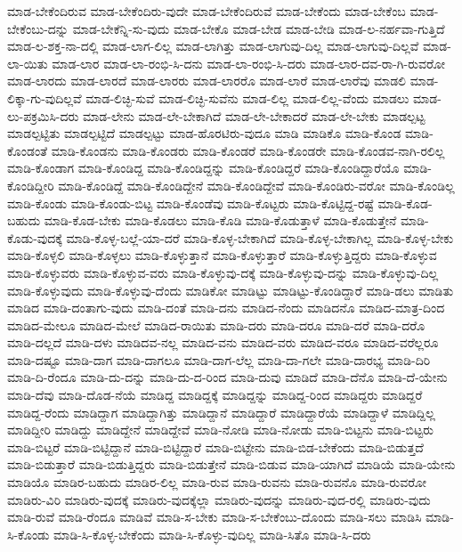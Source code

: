 {ಮಾಡ-ಬೇಕೆಂದಿರುವ
ಮಾಡ-ಬೇಕೆಂದಿರು-ವುದೇ
ಮಾಡ-ಬೇಕೆಂದಿರುವೆ
ಮಾಡ-ಬೇಕೆಂದು
ಮಾಡ-ಬೇಕೆಂಬ
ಮಾಡ-ಬೇಕೆಂಬು-ದನ್ನು
ಮಾಡ-ಬೇಕೆನ್ನಿ-ಸು-ವುದು
ಮಾಡ-ಬೇಕೊ
ಮಾಡ-ಬೇಡ
ಮಾಡ-ಬೇಡಿ
ಮಾಡ-ಲ-ನರ್ಹವಾ-ಗುತ್ತಿದೆ
ಮಾಡ-ಲ-ಶಕ್ತ-ನಾ-ದಲ್ಲಿ
ಮಾಡ-ಲಾಗ-ಲಿಲ್ಲ
ಮಾಡ-ಲಾಗಿತ್ತು
ಮಾಡ-ಲಾಗುವು-ದಿಲ್ಲ
ಮಾಡ-ಲಾಗುವು-ದಿಲ್ಲವೆ
ಮಾಡ-ಲಾ-ಯಿತು
ಮಾಡ-ಲಾರ
ಮಾಡ-ಲಾ-ರಂಭಿ-ಸಿ-ದನು
ಮಾಡ-ಲಾ-ರಂಭಿ-ಸಿ-ದರು
ಮಾಡ-ಲಾರ-ದವ-ರಾ-ಗಿ-ರುವರೋ
ಮಾಡ-ಲಾರದು
ಮಾಡ-ಲಾರದೆ
ಮಾಡ-ಲಾರರು
ಮಾಡ-ಲಾರರೊ
ಮಾಡ-ಲಾರೆ
ಮಾಡ-ಲಾರೆವು
ಮಾಡಲಿ
ಮಾಡ-ಲಿಕ್ಕಾ-ಗು-ವುದಿಲ್ಲವೆ
ಮಾಡ-ಲಿಚ್ಛಿ-ಸುವೆ
ಮಾಡ-ಲಿಚ್ಛಿ-ಸುವೆನು
ಮಾಡ-ಲಿಲ್ಲ
ಮಾಡ-ಲಿಲ್ಲ-ವೆಂದು
ಮಾಡಲು
ಮಾಡ-ಲು-ಪಕ್ರಮಿಸಿ-ದರು
ಮಾಡ-ಲೇನು
ಮಾಡ-ಲೇ-ಬೇಕಾಗಿದೆ
ಮಾಡ-ಲೇ-ಬೇಕಾದರೆ
ಮಾಡ-ಲೇ-ಬೇಕು
ಮಾಡಲ್ಪಟ್ಟ
ಮಾಡಲ್ಪಟ್ಟಿತು
ಮಾಡಲ್ಪಟ್ಟಿದೆ
ಮಾಡಲ್ಪಟ್ಟು
ಮಾಡ-ಹೊರಟಿರು-ವುದೂ
ಮಾಡಿ
ಮಾಡಿಕೊ
ಮಾಡಿ-ಕೊಂಡ
ಮಾಡಿ-ಕೊಂಡಂತೆ
ಮಾಡಿ-ಕೊಂಡನು
ಮಾಡಿ-ಕೊಂಡರು
ಮಾಡಿ-ಕೊಂಡರೆ
ಮಾಡಿ-ಕೊಂಡರೇ
ಮಾಡಿ-ಕೊಂಡವ-ನಾಗಿ-ರಲಿಲ್ಲ
ಮಾಡಿ-ಕೊಂಡಾಗ
ಮಾಡಿ-ಕೊಂಡಿದ್ದ
ಮಾಡಿ-ಕೊಂಡಿದ್ದನ್ನು
ಮಾಡಿ-ಕೊಂಡಿದ್ದರೆ
ಮಾಡಿ-ಕೊಂಡಿದ್ದಾರೆಯೊ
ಮಾಡಿ-ಕೊಂಡಿದ್ದೀರಿ
ಮಾಡಿ-ಕೊಂಡಿದ್ದೆ
ಮಾಡಿ-ಕೊಂಡಿದ್ದೇನೆ
ಮಾಡಿ-ಕೊಂಡಿದ್ದೇವೆ
ಮಾಡಿ-ಕೊಂಡಿರು-ವರೋ
ಮಾಡಿ-ಕೊಂಡಿಲ್ಲ
ಮಾಡಿ-ಕೊಂಡು
ಮಾಡಿ-ಕೊಂಡು-ಬಿಟ್ಟ
ಮಾಡಿ-ಕೊಂಡೆವು
ಮಾಡಿ-ಕೊಟ್ಟರು
ಮಾಡಿ-ಕೊಟ್ಟಿದ್ದ-ರಷ್ಟೆ
ಮಾಡಿ-ಕೊಡ-ಬಹುದು
ಮಾಡಿ-ಕೊಡ-ಬೇಕು
ಮಾಡಿ-ಕೊಡಲು
ಮಾಡಿ-ಕೊಡಿ
ಮಾಡಿ-ಕೊಡುತ್ತಾಳೆ
ಮಾಡಿ-ಕೊಡುತ್ತೇನೆ
ಮಾಡಿ-ಕೊಡು-ವುದಕ್ಕೆ
ಮಾಡಿ-ಕೊಳ್ಳ-ಬಲ್ಲೆ-ಯಾ-ದರೆ
ಮಾಡಿ-ಕೊಳ್ಳ-ಬೇಕಾಗಿದೆ
ಮಾಡಿ-ಕೊಳ್ಳ-ಬೇಕಾಗಿಲ್ಲ
ಮಾಡಿ-ಕೊಳ್ಳ-ಬೇಕು
ಮಾಡಿ-ಕೊಳ್ಳಲಿ
ಮಾಡಿ-ಕೊಳ್ಳಲು
ಮಾಡಿ-ಕೊಳ್ಳುತ್ತಾನೆ
ಮಾಡಿ-ಕೊಳ್ಳುತ್ತಾರೆ
ಮಾಡಿ-ಕೊಳ್ಳುತ್ತಿದ್ದರು
ಮಾಡಿ-ಕೊಳ್ಳುವ
ಮಾಡಿ-ಕೊಳ್ಳುವರು
ಮಾಡಿ-ಕೊಳ್ಳುವ-ವರು
ಮಾಡಿ-ಕೊಳ್ಳುವು-ದಕ್ಕೆ
ಮಾಡಿ-ಕೊಳ್ಳುವು-ದನ್ನು
ಮಾಡಿ-ಕೊಳ್ಳುವು-ದಿಲ್ಲ
ಮಾಡಿ-ಕೊಳ್ಳುವುದು
ಮಾಡಿ-ಕೊಳ್ಳುವು-ದೆಂದು
ಮಾಡಿಕೋ
ಮಾಡಿಟ್ಟು
ಮಾಡಿಟ್ಟು-ಕೊಂಡಿದ್ದಾರೆ
ಮಾಡಿ-ಡಲು
ಮಾಡಿತು
ಮಾಡಿದ
ಮಾಡಿ-ದಂತಾಗು-ವುದು
ಮಾಡಿ-ದಂತೆ
ಮಾಡಿ-ದನು
ಮಾಡಿದ-ನೆಂದು
ಮಾಡಿದನೊ
ಮಾಡಿದ-ಮಾತ್ರ-ದಿಂದ
ಮಾಡಿದ-ಮೇಲೂ
ಮಾಡಿದ-ಮೇಲೆ
ಮಾಡಿದ-ರಾಯಿತು
ಮಾಡಿ-ದರು
ಮಾಡಿ-ದರೂ
ಮಾಡಿ-ದರೆ
ಮಾಡಿ-ದರೊ
ಮಾಡಿ-ದಲ್ಲದೆ
ಮಾಡಿ-ದಳು
ಮಾಡಿದವ-ನಲ್ಲ
ಮಾಡಿದ-ವನು
ಮಾಡಿದ-ವರು
ಮಾಡಿದ-ವರೂ
ಮಾಡಿದ-ವರೆಲ್ಲರೂ
ಮಾಡಿ-ದಷ್ಟೂ
ಮಾಡಿ-ದಾಗ
ಮಾಡಿ-ದಾಗಲೂ
ಮಾಡಿ-ದಾಗ-ಲೆಲ್ಲ
ಮಾಡಿ-ದಾ-ಗಲೇ
ಮಾಡಿ-ದಾರಭ್ಯ
ಮಾಡಿ-ದಿರಿ
ಮಾಡಿ-ದಿ-ರೆಂದೂ
ಮಾಡಿ-ದು-ದನ್ನು
ಮಾಡಿ-ದು-ದ-ರಿಂದ
ಮಾಡಿ-ದುವು
ಮಾಡಿದೆ
ಮಾಡಿ-ದೆನೊ
ಮಾಡಿ-ದೆ-ಯೇನು
ಮಾಡಿ-ದೆವು
ಮಾಡಿ-ದೊಡ-ನೆಯೆ
ಮಾಡಿದ್ದ
ಮಾಡಿದ್ದಕ್ಕೆ
ಮಾಡಿದ್ದನ್ನು
ಮಾಡಿದ್ದ-ರಿಂದ
ಮಾಡಿದ್ದರು
ಮಾಡಿದ್ದರೆ
ಮಾಡಿದ್ದ-ರೆಂದು
ಮಾಡಿದ್ದಾಗ
ಮಾಡಿದ್ದಾಗಿತ್ತು
ಮಾಡಿದ್ದಾನೆ
ಮಾಡಿದ್ದಾರೆ
ಮಾಡಿದ್ದಾರೆಯೆ
ಮಾಡಿದ್ದಾಳೆ
ಮಾಡಿದ್ದಿಲ್ಲ
ಮಾಡಿದ್ದೀರಿ
ಮಾಡಿದ್ದು
ಮಾಡಿದ್ದೇನೆ
ಮಾಡಿದ್ದೇವೆ
ಮಾಡಿ-ನೋಡಿ
ಮಾಡಿ-ನೋಡು
ಮಾಡಿ-ಬಿಟ್ಟನು
ಮಾಡಿ-ಬಿಟ್ಟರು
ಮಾಡಿ-ಬಿಟ್ಟರೆ
ಮಾಡಿ-ಬಿಟ್ಟಿದ್ದಾನೆ
ಮಾಡಿ-ಬಿಟ್ಟಿದ್ದಾರೆ
ಮಾಡಿ-ಬಿಟ್ಟೇನು
ಮಾಡಿ-ಬಿಡ-ಬೇಕೆಂದು
ಮಾಡಿ-ಬಿಡುತ್ತದೆ
ಮಾಡಿ-ಬಿಡುತ್ತಾರೆ
ಮಾಡಿ-ಬಿಡುತ್ತಿದ್ದರು
ಮಾಡಿ-ಬಿಡುತ್ತೇನೆ
ಮಾಡಿ-ಬಿಡುವ
ಮಾಡಿ-ಯಾಗಿದೆ
ಮಾಡಿಯೆ
ಮಾಡಿ-ಯೇನು
ಮಾಡಿಯೊ
ಮಾಡಿರ-ಬಹುದು
ಮಾಡಿರ-ಲಿಲ್ಲ
ಮಾಡಿ-ರುವ
ಮಾಡಿ-ರುವನು
ಮಾಡಿ-ರುವನೊ
ಮಾಡಿ-ರುವರೋ
ಮಾಡಿರು-ವಿರಿ
ಮಾಡಿರು-ವುದಕ್ಕೆ
ಮಾಡಿರು-ವುದಕ್ಕೆಲ್ಲಾ
ಮಾಡಿರು-ವುದನ್ನು
ಮಾಡಿರು-ವುದ-ರಲ್ಲಿ
ಮಾಡಿರು-ವುದು
ಮಾಡಿ-ರುವೆ
ಮಾಡಿ-ರೆಂದೂ
ಮಾಡಿವೆ
ಮಾಡಿ-ಸ-ಬೇಕು
ಮಾಡಿ-ಸ-ಬೇಕೆಂಬು-ದೊಂದು
ಮಾಡಿ-ಸಲು
ಮಾಡಿಸಿ
ಮಾಡಿ-ಸಿ-ಕೊಂಡು
ಮಾಡಿ-ಸಿ-ಕೊಳ್ಳ-ಬೇಕೆಂದು
ಮಾಡಿ-ಸಿ-ಕೊಳ್ಳು-ವುದಿಲ್ಲ
ಮಾಡಿ-ಸಿತೊ
ಮಾಡಿ-ಸಿ-ದರು
}
